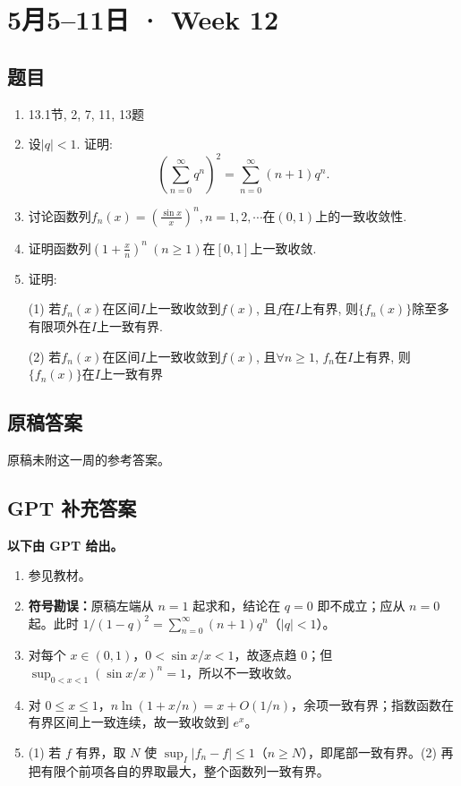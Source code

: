 \documentclass[UTF8,11pt, a4paper, oneside, fontset=none]{ctexbook}
\begin{document}
\clearpage

\section{5月5--11日 · Week 12}

\subsection*{题目}

\begin{enumerate}

\item 13.1节,  2, 7, 11, 13题

\item 设$|q| < 1$. 证明:
\[
\left( \sum_{n=0}^{\infty} q^n \right)^2 = \sum_{n=0}^{\infty} (n+1) q^n.
\]

\item 讨论函数列$f_n(x) = \left( \frac{\sin x}{x} \right)^n, n =1, 2, \cdots$在$(0, 1)$上的一致收敛性.

\item 证明函数列$\left( 1 + \frac{x}{n} \right)^n \ (n \geq 1)$在$[0, 1]$上一致收敛.

\item 证明:


(1) 若$f_n(x)$在区间$I$上一致收敛到$f(x)$, 且$f$在$I$上有界, 则$\{f_n(x) \}$除至多有限项外在$I$上一致有界.

(2) 若$f_n(x)$在区间$I$上一致收敛到$f(x)$, 且$\forall n \geq 1$, $f_n$在$I$上有界, 则$\{f_n(x) \}$在$I$上一致有界

\end{enumerate}

\clearpage

\subsection*{原稿答案}

\noindent 原稿未附这一周的参考答案。

\clearpage

\subsection*{GPT 补充答案}

\noindent\textbf{以下由 GPT 给出。}
\begin{enumerate}
\item 参见教材。
\item \textbf{符号勘误：}原稿左端从 $n=1$ 起求和，结论在 $q=0$ 即不成立；应从 $n=0$ 起。此时 $1/(1-q)^2=\sum_{n=0}^\infty(n+1)q^n$（$|q|<1$）。
\item 对每个 $x\in(0,1)$，$0<\sin x/x<1$，故逐点趋 $0$；但 $\sup_{0<x<1}(\sin x/x)^n=1$，所以不一致收敛。
\item 对 $0\le x\le1$，$n\ln(1+x/n)=x+O(1/n)$，余项一致有界；指数函数在有界区间上一致连续，故一致收敛到 $e^x$。
\item (1) 若 $f$ 有界，取 $N$ 使 $\sup_I|f_n-f|\le1$（$n\ge N$），即尾部一致有界。(2) 再把有限个前项各自的界取最大，整个函数列一致有界。
\end{enumerate}
\end{document}
